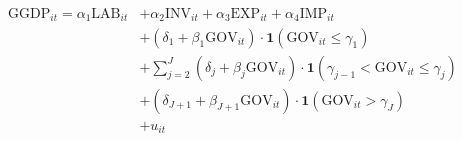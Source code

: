 \documentclass[10pt, oneside]{article}
\begin{document}
\[
	\begin{split}
		\mathrm{GGDP}_{it} = \alpha_1 \mathrm{LAB}_{it} & + \alpha_2 \mathrm{INV}_{it} + \alpha_3 \mathrm{EXP}_{it} + \alpha_4 \mathrm{IMP}_{it}                                  \\
		                                                & + (\delta_1 + \beta_1 \mathrm{GOV}_{it}) \cdot \mathbf{1}(\mathrm{GOV}_{it} \le \gamma_1)                               \\
		                                                & + \sum_{j=2}^{J} (\delta_j + \beta_j \mathrm{GOV}_{it}) \cdot \mathbf{1}(\gamma_{j-1} < \mathrm{GOV}_{it} \le \gamma_j) \\
		                                                & + (\delta_{J+1} + \beta_{J+1} \mathrm{GOV}_{it}) \cdot \mathbf{1}(\mathrm{GOV}_{it} > \gamma_J)                         \\
		                                                & + u_{it}
	\end{split}
\]
\end{document}
